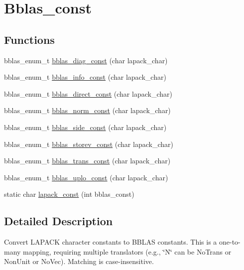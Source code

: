 \hypertarget{group__bblas__const}{}\section{Bblas\+\_\+const}
\label{group__bblas__const}
\subsection*{Functions}
\begin{DoxyCompactItemize}
\item 
bblas\+\_\+enum\+\_\+t \mbox{\hyperlink{group__bblas__const_ga6169647caea1bc4ab77bcf161db8019e}{bblas\+\_\+diag\+\_\+const}} (char lapack\+\_\+char)
\item 
bblas\+\_\+enum\+\_\+t \mbox{\hyperlink{group__bblas__const_gafdc80d2f9b5d3eb302d64147f1c44aa7}{bblas\+\_\+info\+\_\+const}} (char lapack\+\_\+char)
\item 
bblas\+\_\+enum\+\_\+t \mbox{\hyperlink{group__bblas__const_ga5ba578faa6c2dcc4a37e09f1d7aefe7c}{bblas\+\_\+direct\+\_\+const}} (char lapack\+\_\+char)
\item 
bblas\+\_\+enum\+\_\+t \mbox{\hyperlink{group__bblas__const_gac004937c6fbbfee293aa7681e3927fe3}{bblas\+\_\+norm\+\_\+const}} (char lapack\+\_\+char)
\item 
bblas\+\_\+enum\+\_\+t \mbox{\hyperlink{group__bblas__const_ga56e829b323f9ef83d896d4755283039a}{bblas\+\_\+side\+\_\+const}} (char lapack\+\_\+char)
\item 
bblas\+\_\+enum\+\_\+t \mbox{\hyperlink{group__bblas__const_gae9bb1f3a88f105d76062888fea78d4da}{bblas\+\_\+storev\+\_\+const}} (char lapack\+\_\+char)
\item 
bblas\+\_\+enum\+\_\+t \mbox{\hyperlink{group__bblas__const_ga2bd4e89d6fbd7df92e8836e862e96e2a}{bblas\+\_\+trans\+\_\+const}} (char lapack\+\_\+char)
\item 
bblas\+\_\+enum\+\_\+t \mbox{\hyperlink{group__bblas__const_gacc2bf7245fa316e6cbf888a61aa1f1bc}{bblas\+\_\+uplo\+\_\+const}} (char lapack\+\_\+char)
\item 
static char \mbox{\hyperlink{group__bblas__const_gab2e4ef289e7eee71dd23c6d4b817a6a2}{lapack\+\_\+const}} (int bblas\+\_\+const)
\end{DoxyCompactItemize}


\subsection{Detailed Description}
Convert L\+A\+P\+A\+CK character constants to B\+B\+L\+AS constants. This is a one-\/to-\/many mapping, requiring multiple translators (e.\+g., \char`\"{}\+N\char`\"{} can be No\+Trans or Non\+Unit or No\+Vec). Matching is case-\/insensitive. 

